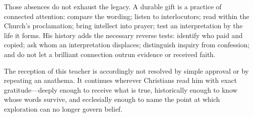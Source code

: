 Those absences do not exhaust the legacy. A durable gift is a
practice of connected attention: compare the wording; listen to interlocutors;
read within the Church's proclamation; bring intellect into prayer; test an
interpretation by the life it forms. His history adds the necessary reverse
tests: identify who paid and copied; ask whom an interpretation displaces;
distinguish inquiry from confession; and do not let a brilliant connection
outrun evidence or received faith.

The reception of this teacher is accordingly not resolved by simple approval
or by repeating an anathema. It continues wherever Christians read him with exact
gratitude---deeply enough to receive what is true, historically enough to know
whose words survive, and ecclesially enough to name the point at which
exploration can no longer govern belief.
